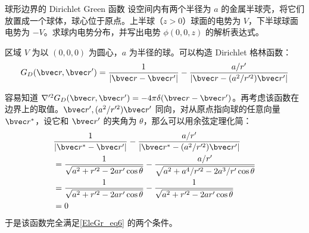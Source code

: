 \begin{example}{球形边界的 Dirichlet Green 函数}
设空间内有两个半径为 $a$ 的金属半球壳，将它们放置成一个球体，球心位于原点。上半球（$z>0$）球面的电势为 $V$，下半球球面电势为 $-V$。求球内电势分布，并写出电势 $\phi(0,0,z)$ 的解析表达式。

区域 $V$ 为以 $(0,0,0)$ 为圆心，$a$ 为半径的球。可以构造 Dirichlet 格林函数：
\begin{equation}
G_D(\bvec r,\bvec r')=\frac{1}{|\bvec r-\bvec r'|}-\frac{a/r'}{|\bvec r-(a^2/r'^2)\bvec r'|}
\end{equation}

容易知道 $\nabla'^2G_D(\bvec r,\bvec r')=-4\pi\delta(\bvec r-\bvec r')$。再考虑该函数在边界上的取值。$\bvec r',(a^2/r'^2)\bvec r'$ 同向，对从原点指向球的任意向量 $\bvec r^*$，设它和 $\bvec r'$ 的夹角为 $\theta$，那么可以用余弦定理化简：
\begin{equation}
\begin{aligned}
&\frac{1}{|\bvec r^*-\bvec r'|}-\frac{a/r'}{|\bvec r^*-(a^2/r'^2)\bvec r'|}
\\&=\frac{1}{\sqrt{a^2+r'^2-2ar'\cos\theta}}-\frac{a/r'}{\sqrt{a^2+a^4/r'^2-2a^3/r'\cos\theta}}
\\&=\frac{1}{\sqrt{a^2+r'^2-2ar'\cos\theta}}-\frac{1}{\sqrt{a^2+r'^2-2ar'\cos\theta}}
\\&=0
\end{aligned}
\end{equation}
于是该函数完全满足\autoref{EleGr_eq6} 的两个条件。


\end{example}
